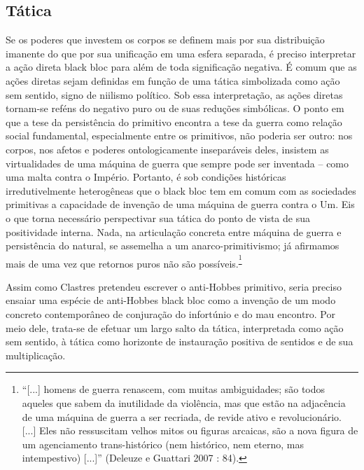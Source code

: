  

\subsection{Tática}

Se os poderes que investem os corpos se definem
mais por sua distribuição imanente do que por sua unificação em uma
esfera separada, é preciso interpretar a ação direta black bloc para
além de toda significação negativa. É comum que as ações diretas sejam
definidas em função de uma tática simbolizada como ação sem sentido,
signo de niilismo político. Sob essa interpretação, as ações diretas
tornam-se reféns do negativo puro ou de suas reduções simbólicas. O
ponto em que a tese da persistência do primitivo encontra a tese da
guerra como relação social fundamental, especialmente entre os
primitivos, não poderia ser outro: nos corpos, nos afetos e poderes
ontologicamente inseparáveis deles, insistem as virtualidades de uma
máquina de guerra que sempre pode ser inventada -- como uma malta contra
o Império. Portanto, é sob condições históricas irredutivelmente
heterogêneas que o black bloc tem em comum com as sociedades primitivas
a capacidade de invenção de uma máquina de guerra contra o Um. Eis o que
torna necessário perspectivar sua tática do ponto de vista de sua
positividade interna. Nada, na articulação concreta entre máquina de
guerra e persistência do natural, se assemelha a um anarco-primitivismo;
já afirmamos mais de uma vez que retornos puros não são
possíveis.\textsuperscript{\footnote{``{[}...{]} homens de guerra
  renascem, com muitas ambiguidades; são todos aqueles que sabem da
  inutilidade da violência, mas que estão na adjacência de uma máquina
  de guerra a ser recriada, de revide ativo e revolucionário. {[}...{]}
  Eles não ressuscitam velhos mitos ou figuras arcaicas, são a nova
  figura de um agenciamento trans-histórico (nem histórico, nem eterno,
  mas intempestivo) {[}...{]}'' (Deleuze e Guattari 2007 : 84).}}

Assim como Clastres pretendeu escrever o anti-Hobbes primitivo, seria
preciso ensaiar uma espécie de anti-Hobbes black bloc como a invenção de
um modo concreto contemporâneo de conjuração do infortúnio e do mau
encontro. Por meio dele, trata-se de efetuar um largo salto da tática,
interpretada como ação sem sentido, à tática como horizonte de
instauração positiva de sentidos e de sua multiplicação.

